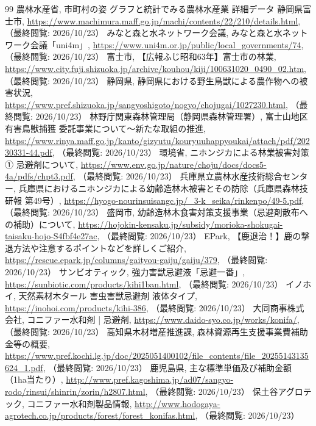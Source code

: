 \documentclass[a4paper, 11pt]{jsarticle}
\begin{document}
\begin{thebibliography}{99}
     農林水産省, 市町村の姿 グラフと統計でみる農林水産業 詳細データ 静岡県富士市, \url{https://www.machimura.maff.go.jp/machi/contents/22/210/details.html}, （最終閲覧: 2026/10/23）
     みなと森と水ネットワーク会議, みなと森と水ネットワーク会議「uni4m」, \url{https://www.uni4m.or.jp/public/local_governments/74}, （最終閲覧: 2026/10/23）
     富士市, 【広報ふじ昭和63年】富士市の林業, \url{https://www.city.fuji.shizuoka.jp/archive/kouhou/kiji/100631020_0490_02.htm}, （最終閲覧: 2026/10/23）
     静岡県, 静岡県における野生鳥獣による農作物への被害状況, \url{https://www.pref.shizuoka.jp/sangyoshigoto/nogyo/chojugai/1027230.html}, （最終閲覧: 2026/10/23）
     林野庁関東森林管理局（静岡県森林管理署）, 富士山地区有害鳥獣捕獲 委託事業について〜新たな取組の推進, \url{https://www.rinya.maff.go.jp/kanto/gizyutu/kouryuuhappyoukai/attach/pdf/20230331-44.pdf}, （最終閲覧: 2026/10/23）
     環境省, ニホンジカによる林業被害対策 ① 忌避剤について, \url{https://www.env.go.jp/nature/choju/docs/docs5-4a/pdfs/chpt3.pdf}, （最終閲覧: 2026/10/23）
     兵庫県立農林水産技術総合センター, 兵庫県におけるニホンジカによる幼齢造林木被害とその防除（兵庫県森林技研報 第49号）, \url{https://hyogo-nourinsuisangc.jp/_3-k_seika/rinkenpo/49-5.pdf}, （最終閲覧: 2026/10/23）
     盛岡市, 幼齢造林木食害対策支援事業（忌避剤散布への補助）について, \url{https://hojokin-kensaku.jp/subsidy/morioka-shokugai-taisaku-hojo-S4fbf4e27ac}, （最終閲覧: 2026/10/23）
     EPark, 【鹿退治！】鹿の撃退方法や注意するポイントなどを詳しくご紹介, \url{https://rescue.epark.jp/columns/gaityou-gaiju/gaiju/379}, （最終閲覧: 2026/10/23）
     サンビオティック, 強力害獣忌避液「忌避一番」, \url{https://sunbiotic.com/products/kihi1ban.html}, （最終閲覧: 2026/10/23）
     イノホイ, 天然素材木タール 害虫害獣忌避剤 液体タイプ, \url{https://inohoi.com/products/kihi-386}, （最終閲覧: 2026/10/23）
     大同商事株式会社, コニファー水和剤 | 忌避剤, \url{https://www.daido-syo.co.jp/works/konifa/}, （最終閲覧: 2026/10/23）
     高知県木材増産推進課, 森林資源再生支援事業費補助金等の概要, \url{https://www.pref.kochi.lg.jp/doc/2025051400102/file_contents/file_20255143135624_1.pdf}, （最終閲覧: 2026/10/23）
     鹿児島県, 主な標準単価及び補助金額（1ha当たり）, \url{http://www.pref.kagoshima.jp/ad07/sangyo-rodo/rinsui/shinrin/zorin/h2807.html}, （最終閲覧: 2026/10/23）
     保土谷アグロテック, コニファー水和剤製品情報, \url{http://www.hodogaya-agrotech.co.jp/products/forest/forest_konifas.html}, （最終閲覧: 2026/10/23）

\end{thebibliography}
\end{document}
